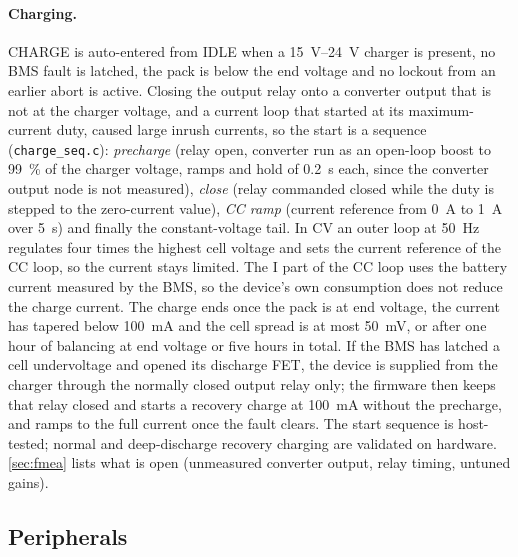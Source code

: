 \paragraph{Charging.} CHARGE is auto-entered from IDLE when a
\qtyrange{15}{24}{\volt} charger is present, no \ac{BMS} fault is latched, the
pack is below the end voltage and no lockout from an earlier abort is active.
Closing the output relay onto a converter output that is not at the charger
voltage, and a current loop that started at its maximum-current duty, caused
large inrush currents, so the start is a sequence (\texttt{charge\_seq.c}):
\emph{precharge} (relay open, converter run as an open-loop boost to
\qty{99}{\percent} of the charger voltage, ramps and hold of
\qty{0.2}{\second} each,
since the converter output node is not measured), \emph{close} (relay
commanded closed while the duty is stepped to the zero-current value),
\emph{CC ramp} (current reference from \qty{0}{\ampere} to \qty{1}{\ampere}
over \qty{5}{\second}) and finally the constant-voltage tail. In CV an outer
loop at \qty{50}{\hertz} regulates four times the highest cell voltage and
sets the current reference of the CC loop, so the current stays limited. The I part of the CC loop uses the battery current measured by the \ac{BMS}, so the device's own consumption does not reduce the charge current. The
charge ends once the pack is at end voltage, the current has tapered below
\qty{100}{\milli\ampere} and the cell spread is at most
\qty{50}{\milli\volt}, or after one hour of balancing at end voltage or
five hours in total. If the \ac{BMS} has latched a cell undervoltage and
opened its discharge \ac{FET}, the device is supplied from the charger through
the normally closed output relay only; the firmware then keeps that relay
closed and starts a recovery charge at \qty{100}{\milli\ampere} without the
precharge, and ramps to the full current once the fault clears. The start
sequence is host-tested; normal and deep-discharge recovery charging are
validated on hardware. \autoref{sec:fmea} lists what is open (unmeasured
converter output, relay timing, untuned gains).

\subsection{Peripherals}

